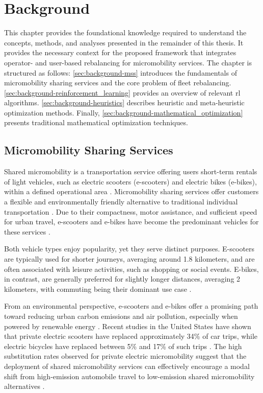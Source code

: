 \chapter{Background}\label{sec:background} %
This chapter provides the foundational knowledge required to understand the concepts, methods, and analyses presented in the remainder of this thesis.
It provides the necessary context for the proposed framework that integrates operator- and user-based rebalancing for micromobility services.
The chapter is structured as follows:
\autoref{sec:background-mss} introduces the fundamentals of micromobility sharing services and the core problem of fleet rebalancing.
\autoref{sec:background-reinforcement_learning} provides an overview of relevant \gls{rl} algorithms.
\autoref{sec:background-heuristics} describes heuristic and meta-heuristic optimization methods.
Finally, \autoref{sec:background-mathematical_optimization} presents traditional mathematical optimization techniques. 

\section{Micromobility Sharing Services}\label{sec:background-mss}
Shared micromobility is a transportation service offering users short-term rentals of light vehicles, such as electric scooters (e-scooters) and electric bikes (e-bikes), within a defined operational area \cite{oeschger_micromobility_2020}.
Micromobility sharing services offer customers a flexible and environmentally friendly alternative to traditional individual transportation \cite{jaber_preferences_2023}.
Due to their compactness, motor assistance, and sufficient speed for urban travel, e-scooters and e-bikes have become the predominant vehicles for these services \cite{liao_electric_2022}. 

Both vehicle types enjoy popularity, yet they serve distinct purposes.
E-scooters are typically used for shorter journeys, averaging around 1.8 kilometers, and are often associated with leisure activities, such as shopping or social events. E-bikes, in contrast, are generally preferred for slightly longer distances, averaging 2 kilometers, with commuting being their dominant use case \cite{liao_electric_2022}.

From an environmental perspective, e-scooters and e-bikes offer a promising path toward reducing urban carbon emissions and air pollution, especially when powered by renewable energy \cite{shen_enhancing_2024}.
Recent studies in the United States have shown that private electric scooters have replaced approximately 34\% of car trips, while electric bicycles have replaced between 5\% and 17\% of such trips \cite{liao_electric_2022}.
The high substitution rates observed for private electric micromobility suggest that the deployment of shared micromobility services can effectively encourage a modal shift from high-emission automobile travel to low-emission shared micromobility alternatives \cite{liao_electric_2022, shen_enhancing_2024}.

